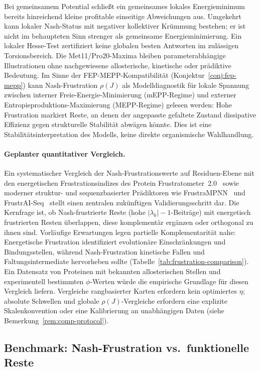 \documentclass[12pt,a4paper]{article}
\theoremstyle{remark}
\begin{document}
Bei gemeinsamem Potential schließt ein gemeinsames lokales Energieminimum bereits hinreichend kleine profitable einseitige Abweichungen aus. Umgekehrt kann lokaler Nash-Status mit negativer kollektiver Krümmung bestehen; er ist nicht im behaupteten Sinn strenger als gemeinsame Energieminimierung. Ein lokaler Hesse-Test zertifiziert keine globalen besten Antworten im zulässigen Torsionsbereich. Die Met11/Pro20-Maxima bleiben parameterabhängige Illustrationen ohne nachgewiesene allosterische, kinetische oder prädiktive Bedeutung.
Im Sinne der FEP-MEPP-Kompatibilität (Konjektur~\ref{conj:fep-mepp}) kann Nash-Frustration $\rho(J)$ als Modelldiagnostik für lokale Spannung zwischen interner Freie-Energie-Minimierung (mEPP-Regime) und externer Entropieproduktions-Maximierung (MEPP-Regime) gelesen werden: Hohe Frustration markiert Reste, an denen der angepasste gefaltete Zustand dissipative Effizienz gegen strukturelle Stabilität abwägen könnte. Dies ist eine Stabilitätsinterpretation des Modells, keine direkte organismische Wahlhandlung.

\paragraph{Geplanter quantitativer Vergleich.}
Ein systematischer Vergleich der Nash-Frustrationswerte auf Residuen-Ebene mit den energetischen Frustrationsindizes des Protein Frustratometer~2.0~\cite{ParraFerreiro2016} sowie moderner struktur- und sequenzbasierter Prädiktoren wie FrustraMPNN~\citep{Beining2026} und FrustrAI-Seq~\citep{Leusch2026} stellt einen zentralen zukünftigen Validierungsschritt dar. Die Kernfrage ist, ob Nash-frustrierte Reste (hohe $|\lambda_k|-1$-Beiträge) mit energetisch frustrierten Resten überlappen, diese komplementär ergänzen oder orthogonal zu ihnen sind. Vorläufige Erwartungen legen partielle Komplementarität nahe: Energetische Frustration identifiziert evolutionäre Einschränkungen und Bindungsstellen, während Nash-Frustration kinetische Fallen und Faltungsintermediate hervorheben sollte (Tabelle~\ref{tab:frustration-comparison}). Ein Datensatz von Proteinen mit bekannten allosterischen Stellen und experimentell bestimmten $\phi$-Werten würde die empirische Grundlage für diesen Vergleich liefern. Vergleiche rangbasierter Karten erfordern kein optimiertes $\eta$; absolute Schwellen und globale $\rho(J)$-Vergleiche erfordern eine explizite Skalenkonvention oder eine Kalibrierung an unabhängigen Daten (siehe Bemerkung~\ref{rem:comp-protocol}).

\subsection{Benchmark: Nash-Frustration vs.\ funktionelle Reste}
\label{sec:frustration-benchmark}
\end{document}
